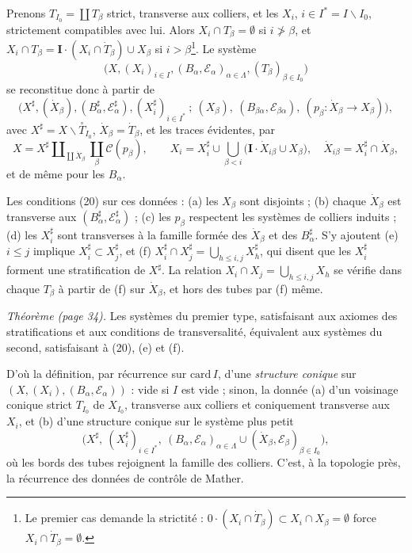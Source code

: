 \documentclass[11pt,a4paper]{article}
\begin{document}
Prenons $T_{I_0} = \coprod T_\beta$ strict, transverse aux colliers, et les $X_i$,
$i \in I^{*} = I \smallsetminus I_0$, strictement compatibles avec lui. Alors
$X_i \cap T_\beta = \emptyset$ si $i \not> \beta$, et $X_i \cap T_\beta =
\mathbf{I} \cdot (X_i \cap \dot T_\beta) \cup X_\beta$ si $i > \beta$\footnote{Le
premier cas demande la strictité : $0 \cdot (X_i \cap \dot T_\beta) \subset X_i
\cap X_\beta = \emptyset$ force $X_i \cap \dot T_\beta = \emptyset$.}. Le système
\[
\bigl(X, (X_i)_{i\in I}, (B_\alpha, \mathcal{E}_\alpha)_{\alpha \in \Lambda},
(T_\beta)_{\beta \in I_0}\bigr)
\]
se reconstitue donc à partir de
\[
\bigl(X^{\sharp}, (\dot X_\beta), (B^{\sharp}_\alpha, \mathcal{E}^{\sharp}_\alpha),
(X^{\sharp}_i)_{i \in I^{*}}\ ;\ (X_\beta),\ (B_{\beta\alpha},
\mathcal{E}_{\beta\alpha}),\ (p_\beta : \dot X_\beta \to X_\beta)\bigr),
\]
avec $X^{\sharp} = X \smallsetminus \overset{\circ}{T}_{I_0}$, $\dot X_\beta = \dot
T_\beta$, et les traces évidentes, par
\[
X = X^{\sharp} \amalg_{\coprod \dot X_\beta} \coprod_\beta \mathcal{C}(p_\beta),
\qquad
X_i = X^{\sharp}_i \cup \bigcup_{\beta < i} \bigl(\mathbf{I}\cdot \dot X_{i\beta}
\cup X_\beta\bigr),\quad \dot X_{i\beta} = X^{\sharp}_i \cap \dot X_\beta ,
\]
et de même pour les $B_\alpha$.

Les conditions (20) sur ces données : (a) les $X_\beta$ sont disjoints ; (b) chaque
$\dot X_\beta$ est transverse aux $(B^{\sharp}_\alpha, \mathcal{E}^{\sharp}_\alpha)$ ;
(c) les $p_\beta$ respectent les systèmes de colliers induits ; (d) les
$X^{\sharp}_i$ sont transverses à la famille formée des $\dot X_\beta$ et des
$B^{\sharp}_\alpha$. S'y ajoutent (e) $i \leq j$ implique $X^{\sharp}_i \subset
X^{\sharp}_j$, et (f) $X^{\sharp}_i \cap X^{\sharp}_j = \bigcup_{h \leq i,j}
X^{\sharp}_h$, qui disent que les $X^{\sharp}_i$ forment une stratification de
$X^{\sharp}$. La relation $X_i \cap X_j = \bigcup_{h\leq i,j} X_h$ se vérifie dans
chaque $T_\beta$ à partir de (f) sur $\dot X_\beta$, et hors des tubes par (f)
même.

\emph{Théorème (page 34).} Les systèmes du premier type, satisfaisant aux axiomes
des stratifications et aux conditions de transversalité, équivalent aux systèmes
du second, satisfaisant à (20), (e) et (f).

D'où la définition, par récurrence sur $\mathrm{card}\, I$, d'une \emph{structure
conique} sur $(X, (X_i), (B_\alpha, \mathcal{E}_\alpha))$ : vide si $I$ est vide ;
sinon, la donnée (a) d'un voisinage conique strict $T_{I_0}$ de $X_{I_0}$,
transverse aux colliers et coniquement transverse aux $X_i$, et (b) d'une structure
conique sur le système plus petit
\[
\bigl(X^{\sharp},\ (X^{\sharp}_i)_{i\in I^{*}},\ (B_\alpha, \mathcal{E}_\alpha)_{\alpha
\in \Lambda} \cup (\dot X_\beta, \mathcal{E}_\beta)_{\beta \in I_0}\bigr),
\]
où les bords des tubes rejoignent la famille des colliers. C'est, à la topologie
près, la récurrence des données de contrôle de Mather.
\end{document}
